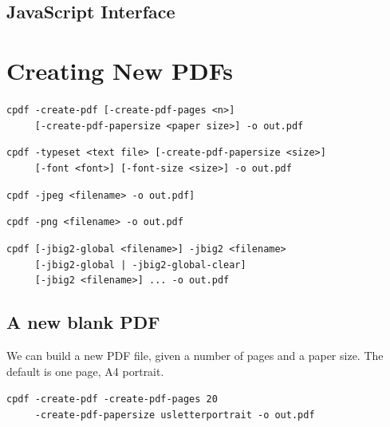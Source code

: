 \documentclass{book}
\begin{document}
\begin{jscpdflib}
\clearpage
\section*{JavaScript Interface}
\begin{small}\tt

\end{small}
\end{jscpdflib}

\clearpage\pagestyle{empty}
\chapter{Creating New PDFs}\label{chap:17}\pagestyle{fancy}

  {\small\begin{framed}
  \noindent\verb!cpdf -create-pdf [-create-pdf-pages <n>]!\\
  \noindent\verb!     [-create-pdf-papersize <paper size>] -o out.pdf!

  \vspace{1.5mm}
  \noindent\verb!cpdf -typeset <text file> [-create-pdf-papersize <size>]!\\
  \noindent\verb!     [-font <font>] [-font-size <size>] -o out.pdf!

  \vspace{1.5mm}
  \noindent\verb!cpdf -jpeg <filename> -o out.pdf]!

  \vspace{1.5mm}
  \noindent\verb!cpdf -png <filename> -o out.pdf!

  \vspace{1.5mm}
  \noindent\verb!cpdf [-jbig2-global <filename>] -jbig2 <filename>!\\
  \noindent\verb!     [-jbig2-global | -jbig2-global-clear]!\\
  \noindent\verb!     [-jbig2 <filename>] ... -o out.pdf!
  \end{framed}}

\section{A new blank PDF}

We can build a new PDF file, given a number of pages and a paper size. The default is one page, A4 portrait.

\begin{framed}
 \noindent\small\verb?cpdf -create-pdf -create-pdf-pages 20?\\
 \noindent\small\verb?     -create-pdf-papersize usletterportrait -o out.pdf?
\end{framed}
\end{document}

